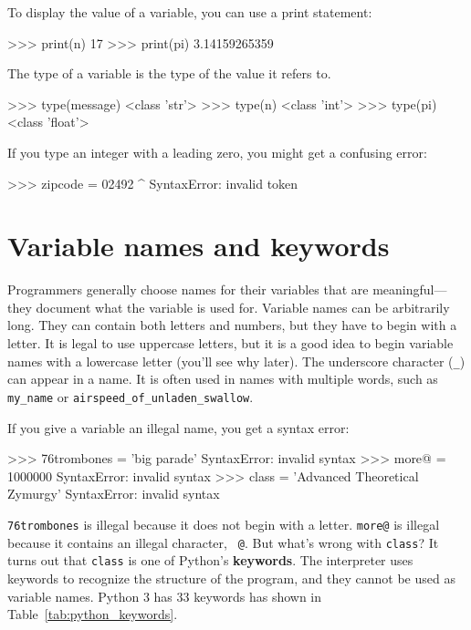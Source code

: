 To display the value of a variable, you can use a print statement:

\beforeverb
\begin{pyinterpreter}
>>> print(n)
17
>>> print(pi)
3.14159265359
\end{pyinterpreter}
\afterverb
%
The type of a variable is the type of the value it refers to.

\beforeverb
\begin{pyinterpreter}
>>> type(message)
<class 'str'>
>>> type(n)
<class 'int'>
>>> type(pi)
<class 'float'>
\end{pyinterpreter}
\afterverb
%
\begin{remark}
If you type an integer with a leading zero, you might get
a confusing error:

\beforeverb
\begin{pyinterpreter}
>>> zipcode = 02492
                  ^
SyntaxError: invalid token
\end{pyinterpreter}
\afterverb
\end{remark}




\section{Variable names and keywords}

Programmers generally choose names for their variables that
are meaningful---they document what the variable is used for.
Variable names can be arbitrarily long.  They can contain
both letters and numbers, but they have to begin with a letter.
It is legal to use uppercase letters, but it is a good idea
to begin variable names with a lowercase letter (you'll
see why later).
The underscore character (\verb"_") can appear in a name.
It is often used in names with multiple words, such as
\verb"my_name" or \verb"airspeed_of_unladen_swallow".


If you give a variable an illegal name, you get a syntax error:

\beforeverb
\begin{pyinterpreter}
>>> 76trombones = 'big parade'
SyntaxError: invalid syntax
>>> more@ = 1000000
SyntaxError: invalid syntax
>>> class = 'Advanced Theoretical Zymurgy'
SyntaxError: invalid syntax
\end{pyinterpreter}
\afterverb
%
{\tt 76trombones} is illegal because it does not begin with a letter.
{\tt more@} is illegal because it contains an illegal character, {\tt
@}.  But what's wrong with {\tt class}?
It turns out that {\tt class} is one of Python's {\bf keywords}.  The
interpreter uses keywords to recognize the structure of the program,
and they cannot be used as variable names.
Python 3 has 33 keywords has shown in Table~\ref{tab:python_keywords}.

